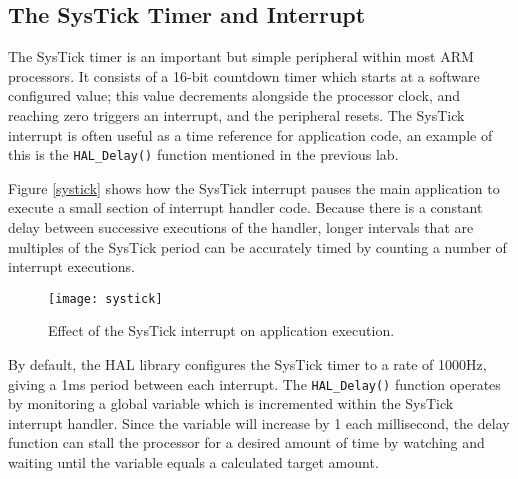 \documentclass[11pt,fleqn]{book} %
\begin{document}
\subsection{The SysTick Timer and Interrupt}
The SysTick timer is an important but simple peripheral within most ARM processors. It consists of a 16-bit countdown timer which starts at a software configured value; this value decrements alongside the processor clock, and reaching zero triggers an interrupt, and the peripheral resets. The SysTick interrupt is often useful as a time reference for application code, an example of this is the \texttt{HAL\_Delay()} function mentioned in the previous lab. 

Figure \vref{systick} shows how the SysTick interrupt pauses the main application to execute a small section of interrupt handler code. Because there is a constant delay between successive executions of the handler, longer intervals that are multiples of the SysTick period can be accurately timed by counting a number of interrupt executions.  

\begin{figure}[h]
    \centering\texttt{[image: systick]}
    \caption{Effect of the SysTick interrupt on application execution.}
    \label{systick}
\end{figure}

By default, the HAL library configures the SysTick timer to a rate of 1000Hz, giving a 1ms period between each interrupt. The \texttt{HAL\_Delay()} function operates by monitoring a global variable which is incremented within the SysTick interrupt handler. Since the variable will increase by 1 each millisecond, the delay function can stall the processor for a desired amount of time by watching and waiting until the variable equals a calculated target amount. 
\end{document}

